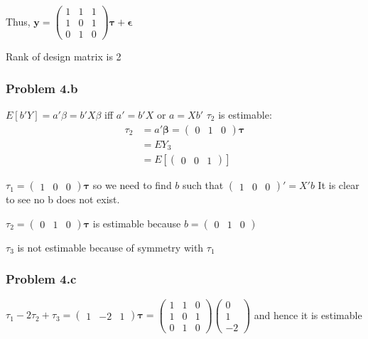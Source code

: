 \documentclass[a4paper]{article}
\begin{document}
Thus, $\mathbf{y} = \begin{pmatrix}1 & 1& 1\\
1 & 0 & 1\\
0 & 1 & 0
\end{pmatrix}\mathbf{\tau} + \mathbf{\epsilon}$

Rank of design matrix is 2

\subsubsection*{Problem 4.b}

$E[b'Y] = a'\beta = b'X\beta$ iff $a'=b'X$ or $a=Xb'$
$\tau_2$ is estimable:
\begin{align*}
\tau_2  &= a'\mathbf{\beta}= \begin{pmatrix}0 & 1 & 0\end{pmatrix}\mathbf{\tau}\\
&= EY_3\\
&= E[\begin{pmatrix}0 & 0 & 1\end{pmatrix}]
\end{align*}


$\tau_1 = \begin{pmatrix}1 & 0 & 0 \end{pmatrix}\mathbf{\tau}$ so we need to find $b$ such that $\begin{pmatrix}1 & 0 & 0 \end{pmatrix}' = X'b$ It is clear to see no b does not exist.

$\tau_2 =  \begin{pmatrix}0 & 1 & 0\end{pmatrix}\mathbf{\tau}$ is estimable because $b=\begin{pmatrix}0 & 1 & 0 \end{pmatrix}$

$\tau_3$ is not estimable because of symmetry with $\tau_1$

\subsubsection*{Problem 4.c}

$\tau_1-2\tau_2+\tau_3 = \begin{pmatrix}1 &-2 &1 \end{pmatrix}\mathbf{\tau} = \begin{pmatrix}1 &1 &0\\ 1 &0 &1\\ 0 & 1 & 0\end{pmatrix} \begin{pmatrix}0\\1\\-2\end{pmatrix}$ and hence it is estimable
\end{document}
